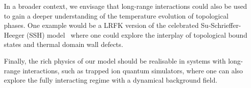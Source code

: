 In a broader context, we envisage that long-range interactions could also be used to gain a deeper understanding of the temperature evolution of topological phases. One example would be a LRFK version of the celebrated Su-Schrieffer-Heeger (SSH) model~\autocite{batraPhysicsCoffeeDoughnuts2020,suSolitonsPolyacetylene1979} where one could explore the interplay of topological bound states and thermal domain wall defects.

Finally, the rich physics of our model should be realisable in systems with long-range interactions, such as trapped ion quantum simulators, where one can also explore the fully interacting regime with a dynamical background field.
